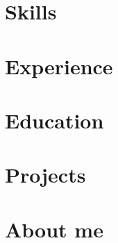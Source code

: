 \documentclass[letter,11pt]{article}
\begin{document}
\section{Skills}


\section{Experience}


\pagebreak
\section{Education}


\section{Projects}


\section{About me}

\end{document}
